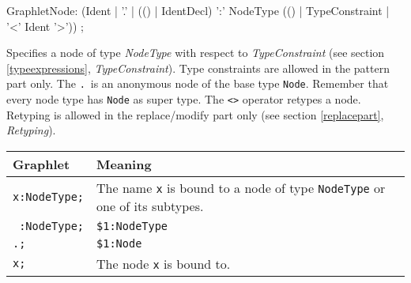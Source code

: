 \begin{rail}
GraphletNode: (Ident | 
    '.' |
    (() | IdentDecl) ':' NodeType (() | TypeConstraint | '<' Ident '>')) ;   
\end{rail}
Specifies a node of type \emph{NodeType} with respect to \emph{TypeConstraint} (see section \ref{typeexpressions}, \emph{TypeConstraint}). 
Type constraints are allowed in the pattern part only. 
The \texttt{.}\ is an anonymous node of the base type \texttt{Node}. 
Remember that every node type has \texttt{Node} as super type. The \texttt{<>} operator retypes a node. Retyping is allowed in the replace/modify part only (see section \ref{replacepart}, \emph{Retyping}).
\begin{center}
  \begin{tabularx}{\linewidth}{lX}
    \textbf{Graphlet} & \textbf{Meaning}\\ \hline
    \texttt{x:NodeType;} & The name \texttt{x} is bound to a node of type \texttt{NodeType} or one of its subtypes. \\
    \texttt{ :NodeType;} & \texttt{\$1:NodeType} \\
    \texttt{.;} & \texttt{\$1:Node} \\
    \texttt{x;} & The node \texttt{x} is bound to.
  \end{tabularx}
\end{center} 

